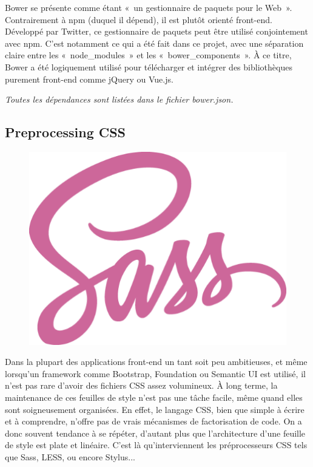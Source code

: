 \documentclass[a4paper,12pt]{article}
\begin{document}
Bower se présente comme étant «~un gestionnaire de paquets pour le Web~». Contrairement à npm (duquel il dépend), il est plutôt orienté front-end. Développé par Twitter, ce gestionnaire de paquets peut être utilisé conjointement avec npm. C'est notamment ce qui a été fait dans ce projet, avec une séparation claire entre les «~node\_modules~» et les «~bower\_components~». À ce titre, Bower a été logiquement utilisé pour télécharger et intégrer des bibliothèques purement front-end comme jQuery ou Vue.js.

\textit{Toutes les dépendances sont listées dans le fichier bower.json.}

\newpage

\subsection{Preprocessing CSS}

\begin{figure}[!h]
  \begin{center}
    \includegraphics[scale=0.2]{logo-sass.png}
  \end{center}
\end{figure}

Dans la plupart des applications front-end un tant soit peu ambitieuses, et même lorsqu'un framework comme Bootstrap, Foundation ou Semantic UI est utilisé, il n'est pas rare d'avoir des fichiers CSS assez volumineux. À long terme, la maintenance de ces feuilles de style n'est pas une tâche facile, même quand elles sont soigneusement organisées. En effet, le langage CSS, bien que simple à écrire et à comprendre, n'offre pas de vrais mécanismes de factorisation de code. On a donc souvent tendance à se répéter, d'autant plus que l'architecture d'une feuille de style est plate et linéaire. C'est là qu'interviennent les préprocesseurs CSS tels que Sass, LESS, ou encore Stylus...
\end{document}
